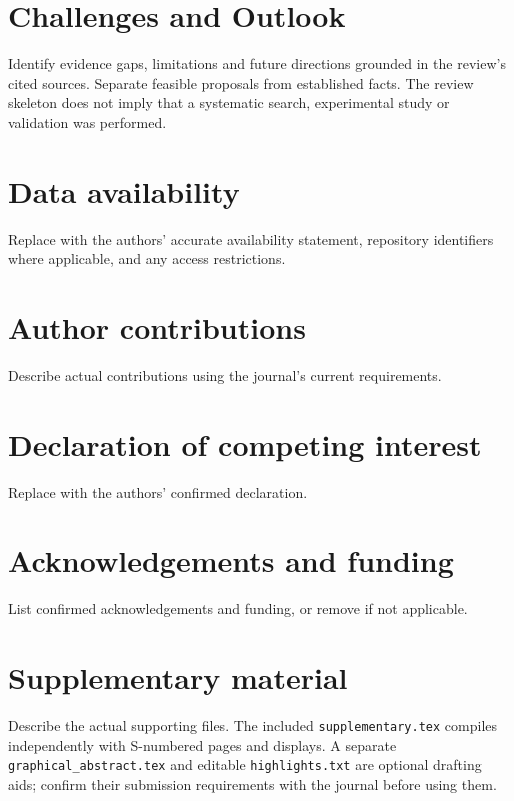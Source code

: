 \documentclass[a4paper,preprint,12pt]{elsarticle}
\begin{document}
\section{Challenges and Outlook}\label{sec:outlook}
Identify evidence gaps, limitations and future directions grounded in the
review's cited sources. Separate feasible proposals from established facts.
The review skeleton does not imply that a systematic search, experimental
study or validation was performed.

\section*{Data availability}
Replace with the authors' accurate availability statement, repository
identifiers where applicable, and any access restrictions.
\section*{Author contributions}
Describe actual contributions using the journal's current requirements.
\section*{Declaration of competing interest}
Replace with the authors' confirmed declaration.
\section*{Acknowledgements and funding}
List confirmed acknowledgements and funding, or remove if not applicable.
\section*{Supplementary material}
Describe the actual supporting files. The included \texttt{supplementary.tex}
compiles independently with S-numbered pages and displays. A separate
\texttt{graphical\_abstract.tex} and editable \texttt{highlights.txt} are
optional drafting aids; confirm their submission requirements with the
journal before using them.



\end{document}
